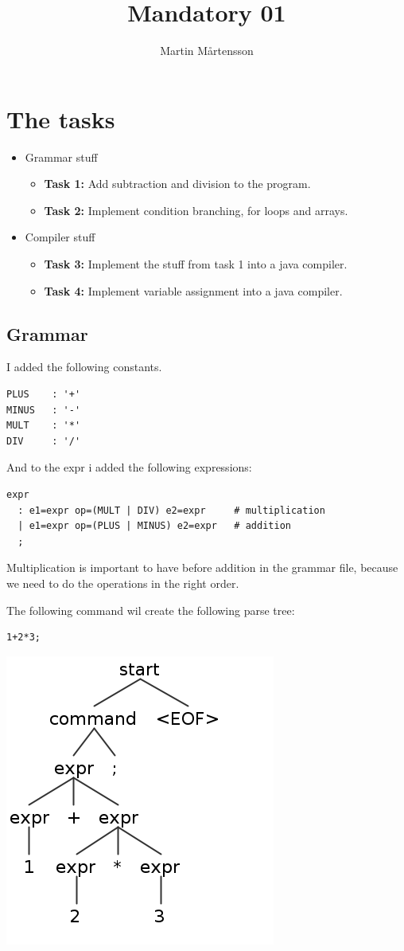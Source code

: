\documentclass[a4paper]{article}
\title{Mandatory 01}
\author{Martin Mårtensson}
\begin{document}
\maketitle
\section{The tasks}
\begin{itemize}
  \item Grammar stuff
    \begin{itemize}
      \item \textbf{Task 1:} Add subtraction and division to the program.
      \item \textbf{Task 2:} Implement condition branching, for loops and arrays.
    \end{itemize}
  \item Compiler stuff
    \begin{itemize}
      \item \textbf{Task 3:} Implement the stuff from task 1 into a java compiler.
      \item \textbf{Task 4:} Implement variable assignment into a java compiler.
    \end{itemize}
\end{itemize}
\textit{}
\subsection{Grammar}
I added the following constants.
\begin{verbatim}
PLUS    : '+'
MINUS   : '-'
MULT    : '*'
DIV     : '/'
\end{verbatim}
And to the expr i added the following expressions:
\begin{verbatim}
expr
  : e1=expr op=(MULT | DIV) e2=expr     # multiplication
  | e1=expr op=(PLUS | MINUS) e2=expr   # addition
  ;
\end{verbatim}
Multiplication is important to have before addition in the grammar file, because we need to do the operations in the right order.

The following command wil create the following parse tree:
\begin{verbatim}
1+2*3;
\end{verbatim}
\begin{center}
  \includegraphics[width=.5\textwidth]{img1.png}
\end{center}
\end{document}
